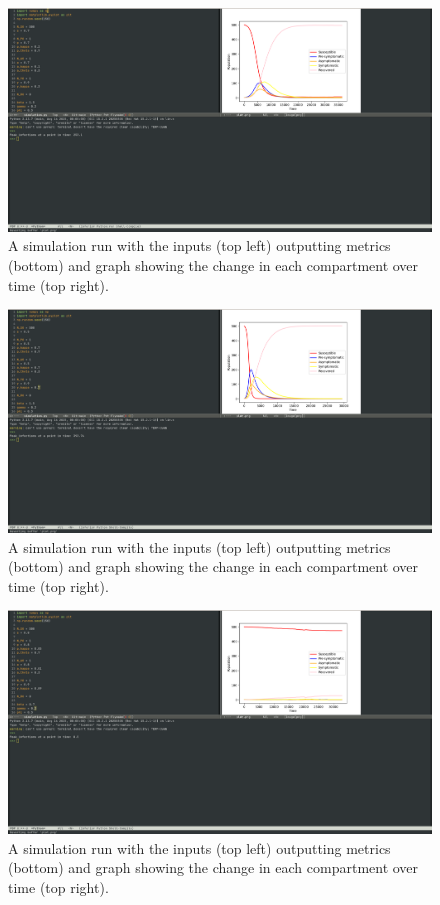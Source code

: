 \documentclass{article}
\begin{document}
\begin{figure}
  \includegraphics[scale=0.3]{running1.png}
  \caption{A simulation run with the inputs (top left) outputting metrics (bottom) and graph showing the change in each compartment over time (top right).}
\end{figure}
\begin{figure}
  \includegraphics[scale=0.3]{running2.png}
  \caption{A simulation run with the inputs (top left) outputting metrics (bottom) and graph showing the change in each compartment over time (top right).}
\end{figure}
\begin{figure}
  \includegraphics[scale=0.3]{running3.png}
  \caption{A simulation run with the inputs (top left) outputting metrics (bottom) and graph showing the change in each compartment over time (top right).}
\end{figure}
\end{document}
